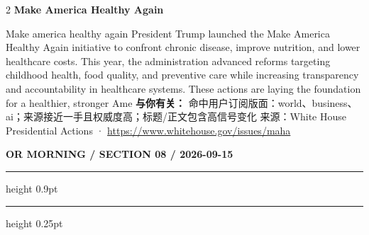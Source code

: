 \documentclass[10.5pt]{ctexart}
\begin{document}
\begin{multicols}{2}
{\large\bfseries Make America Healthy Again}\par
Make america healthy again President Trump launched the Make America Healthy Again initiative to confront chronic disease, improve nutrition, and lower healthcare costs. This year, the administration advanced reforms targeting childhood health, food quality, and preventive care while increasing transparency and accountability in healthcare systems. These actions are laying the foundation for a healthier, stronger Ame
\textbf{与你有关：} 命中用户订阅版面：world、business、ai；来源接近一手且权威度高；标题/正文包含高信号变化
{\footnotesize\color{ormuted} 来源：White House Presidential Actions · \url{https://www.whitehouse.gov/issues/maha}}
\end{multicols}
\newpage
{\small\bfseries OR MORNING / SECTION 08 / 2026-09-15}
\vspace{2mm}
\hrule height 0.9pt
\vspace{1.5mm}
\hrule height 0.25pt
\vspace{4mm}
\end{document}
